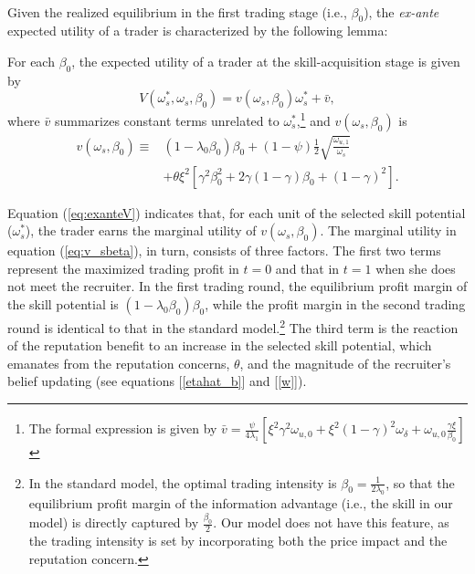 \paragraph{}
Given the realized equilibrium in the first trading stage (i.e., $\beta_{0}$), the \textit{ex-ante} expected utility of a trader is characterized by the following lemma:
\begin{lemma}\label{lem:expU_skill}
For each $\beta_{0}$, the expected utility of a trader at the skill-acquisition stage is given by
\begin{equation}
 V(\omega_{s}^{*},\omega_{s},\beta_{0}) = v(\omega_{s},\beta_{0})\omega_{s}^{*} + \bar{v}, \label{eq:exanteV}
\end{equation}
where $\bar{v}$ summarizes constant terms unrelated to $\omega_{s}^{*}$,\footnote{The formal expression is given by $\bar{v} =\frac{\psi}{4\lambda_{1}}\left[{\xi}^{2}\gamma^{2}\omega_{u,0}+\xi^{2}(1-\gamma)^{2}\omega_{\delta}+\omega_{u,0}\frac{\gamma\xi}{\beta_{0}}\right]$} and $v(\omega_{s},\beta_{0})$ is
\begin{align}
     v(\omega_{s},\beta_{0})\equiv&(1-\lambda_{0}\beta_{0})\beta_{0}   +(1-\psi)\frac{1}{2}\sqrt{\frac{\omega_{u,1}}{\omega_{s}}} \nonumber \\
     & +\theta \xi^2 \left[\gamma^2 \beta_{0}^2 + 2\gamma(1-\gamma)\beta_{0}+ (1-\gamma)^2\right].\label{eq:v_sbeta}
\end{align}
\end{lemma}

Equation (\ref{eq:exanteV}) indicates that, for each unit of the selected skill potential ($\omega_{s}^{*}$), the trader earns the marginal utility of $v(\omega_{s},\beta_{0})$.
The marginal utility in equation (\ref{eq:v_sbeta}), in turn, consists of three factors. The first two terms represent the maximized trading profit in $t=0$ and that in $t=1$ when she does not meet the recruiter. In the first trading round, the equilibrium profit margin of the skill potential is $(1-\lambda_{0}\beta_{0})\beta_{0}$, while the profit margin in the second trading round is identical to that in the standard \cite{kyle1985continuous} model.\footnote{In the standard \citet{kyle1985continuous} model, the optimal trading intensity is $\beta_{0} = \frac{1}{2\lambda_{0}}$, so that the equilibrium profit margin of the information advantage (i.e., the skill in our model) is directly captured by $\frac{\beta_{0}}{2}$. Our model does not have this feature, as the trading intensity is set by incorporating both the price impact and the reputation concern.} The third term is the reaction of the reputation benefit to an increase in the selected skill potential, which emanates from the reputation concerns, $\theta$, and the magnitude of the recruiter's belief updating (see equations [\ref{etahat_b}] and [\ref{w}]).  

